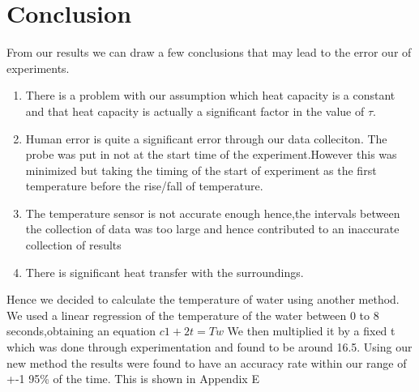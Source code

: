 \documentclass[10pt]{article}
\begin{document}
\section{Conclusion}
From our results we can draw a few conclusions that may lead to the error our of experiments.
{\begin{enumerate}
  \item There is a problem with our assumption which heat capacity is a constant and that heat capacity is actually a significant factor in the value of $\tau$.
  \item Human error is quite a significant error through our data colleciton. The probe was put in not at the start time of the experiment.However this was minimized but taking the timing of the start of experiment as the first temperature before the rise/fall of temperature.
  \item The temperature sensor is not accurate enough hence,the intervals between the collection of data was too large and hence contributed to an inaccurate collection of results
  \item There is significant heat transfer with the surroundings.

\end{enumerate}}
Hence we decided to calculate the temperature of water using another method. We used a linear regression of the temperature of the water between 0 to 8 seconds,obtaining an equation $c1+2t=Tw$ We then multiplied it by a fixed t which was done through experimentation and found to be around 16.5. Using our new method the results were found to have an accuracy rate within our range of +-1  95\% of the time. This is shown in Appendix E
\newpage
\end{document}
